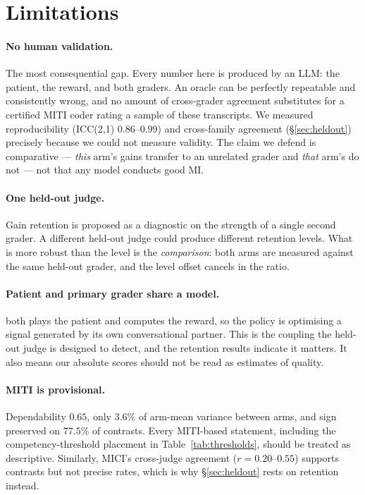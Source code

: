 \section*{Limitations}
\label{sec:limitations}

\paragraph{No human validation.} The most consequential gap. Every number here is produced by
an LLM: the patient, the reward, and both graders. An oracle can be perfectly repeatable and
consistently wrong, and no amount of cross-grader agreement substitutes for a certified MITI
coder rating a sample of these transcripts. We measured reproducibility (ICC(2,1)
$0.86$--$0.99$) and cross-family agreement (\S\ref{sec:heldout}) precisely because we could not
measure validity. The claim we defend is comparative --- \emph{this} arm's gains transfer to an
unrelated grader and \emph{that} arm's do not --- not that any model conducts good MI.

\paragraph{One held-out judge.} Gain retention is proposed as a diagnostic on the strength of a
single second grader. A different held-out judge could produce different retention levels. What
is more robust than the level is the \emph{comparison}: both arms are measured against the same
held-out grader, and the level offset cancels in the ratio.

\paragraph{Patient and primary grader share a model.} \primaryjudge{} both plays the patient
and computes the reward, so the policy is optimising a signal generated by its own
conversational partner. This is the coupling the held-out judge is designed to detect, and the
retention results indicate it matters. It also means our absolute scores should not be read as
estimates of quality.

\paragraph{MITI is provisional.} Dependability $0.65$, only $3.6\%$ of arm-mean variance
between arms, and sign preserved on $77.5\%$ of contrasts. Every MITI-based statement,
including the competency-threshold placement in Table~\ref{tab:thresholds}, should be treated
as descriptive. Similarly, MICI's cross-judge agreement ($r=0.20$--$0.55$) supports contrasts
but not precise rates, which is why \S\ref{sec:heldout} rests on retention instead.

